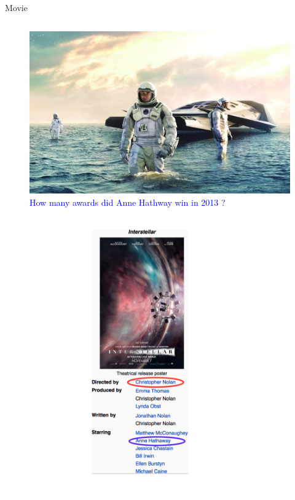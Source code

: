 \documentclass{beamer}
\begin{document}
\begin{frame}{Movie}
	\begin{figure}
	\begin{columns}[c]
			\centering\includegraphics[width=1.0\textwidth]{introduction/interstellar.jpg}\\
			 \textcolor{blue}{How many awards did Anne Hathway win in 2013 ?} \\
			\centering\includegraphics[width=0.85\textwidth]{introduction/interstellar_info_tagged.pdf}
		\end{columns}
	\end{figure}
\end{frame}
\end{document}
